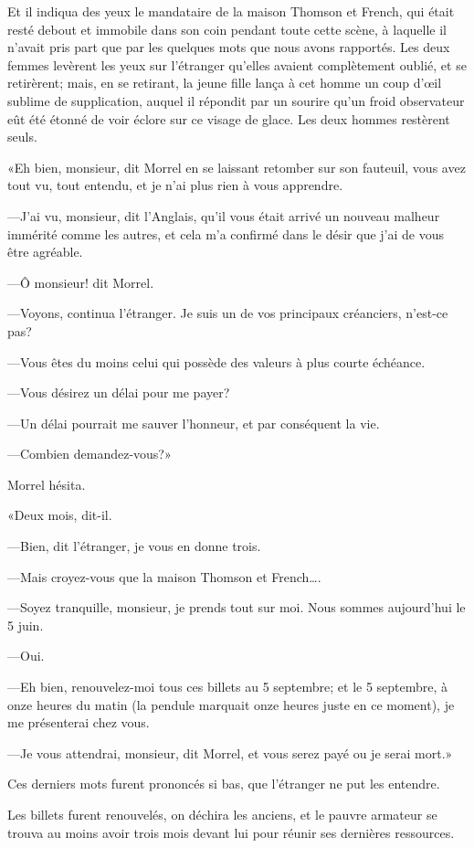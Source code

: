Et il indiqua des yeux le mandataire de la maison Thomson et French, qui était resté debout et immobile dans son coin pendant toute cette scène, à laquelle il n'avait pris part que par les quelques mots que nous avons rapportés. Les deux femmes levèrent les yeux sur l'étranger qu'elles avaient complètement oublié, et se retirèrent; mais, en se retirant, la jeune fille lança à cet homme un coup d'œil sublime de supplication, auquel il répondit par un sourire qu'un froid observateur eût été étonné de voir éclore sur ce visage de glace. Les deux hommes restèrent seuls.

«Eh bien, monsieur, dit Morrel en se laissant retomber sur son fauteuil, vous avez tout vu, tout entendu, et je n'ai plus rien à vous apprendre.

—J'ai vu, monsieur, dit l'Anglais, qu'il vous était arrivé un nouveau malheur immérité comme les autres, et cela m'a confirmé dans le désir que j'ai de vous être agréable.

—Ô monsieur! dit Morrel.

—Voyons, continua l'étranger. Je suis un de vos principaux créanciers, n'est-ce pas?

—Vous êtes du moins celui qui possède des valeurs à plus courte échéance.

—Vous désirez un délai pour me payer?

—Un délai pourrait me sauver l'honneur, et par conséquent la vie.

—Combien demandez-vous?»

Morrel hésita.

«Deux mois, dit-il.

—Bien, dit l'étranger, je vous en donne trois.

—Mais croyez-vous que la maison Thomson et French\dots.

—Soyez tranquille, monsieur, je prends tout sur moi. Nous sommes aujourd'hui le 5 juin.

—Oui.

—Eh bien, renouvelez-moi tous ces billets au 5 septembre; et le 5 septembre, à onze heures du matin (la pendule marquait onze heures juste en ce moment), je me présenterai chez vous.

—Je vous attendrai, monsieur, dit Morrel, et vous serez payé ou je serai mort.»

Ces derniers mots furent prononcés si bas, que l'étranger ne put les entendre.

Les billets furent renouvelés, on déchira les anciens, et le pauvre armateur se trouva au moins avoir trois mois devant lui pour réunir ses dernières ressources.

